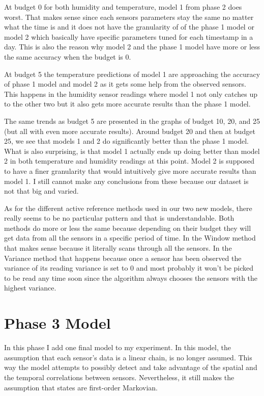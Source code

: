 \documentclass{article}
\begin{document}
At budget 0 for both humidity and temperature,
model 1 from phase 2 does worst. That makes sense
since each sensors parameters stay the same no
matter what the time is and it does not have the
granularity of of the phase 1 model or model 2
which basically have specific parameters tuned
for each timestamp in a day. This is also the
reason why model 2 and the phase 1 model have
more or less the same accuracy when the budget
is 0.

At budget 5 the temperature predictions
of model 1 are approaching the accuracy of
phase 1 model and model 2 as it gets some
help from the observed sensors. This happens
in the humidity sensor readings where model 1
not only catches up to the other two but it also
gets more accurate results than the phase 1
model.

The same trends as budget 5 are presented in
the graphs of budget 10, 20, and 25 (but all with even
more accurate results). Around budget 20 and then
at budget 25, we see that models 1 and 2 do
significantly better than the phase 1 model.
What is also surprising, is that model 1 actually
ends up doing better than model 2 in both
temperature and humidity readings at this point.
Model 2 is supposed to have a finer granularity
that would intuitively give more accurate results
than model 1. I still cannot make any conclusions
from these because our dataset is not that big
and varied.

As for the different active reference methods
used in our two new models, there really seems
to be no particular pattern and that is
understandable. Both methods do more or less
the same because depending on their budget
they will get data from all the sensors in a
specific period of time. In the Window method
that makes sense because it literally scans
through all the sensors. In the Variance method
that happens because once a sensor has been
observed the variance of its reading variance
is set to 0 and most probably it won't be
picked to be read any time soon since the
algorithm always chooses the sensors with
the highest variance.

\section{Phase 3 Model}

In this phase I add one final model to my
experiment. In this model, the assumption that
each sensor's data is a linear chain, is no longer
assumed. This way the model attempts to possibly
detect and take advantage of the spatial and the
temporal correlations between sensors. Nevertheless,
it still makes the assumption that states are
first-order Markovian.
\end{document}
